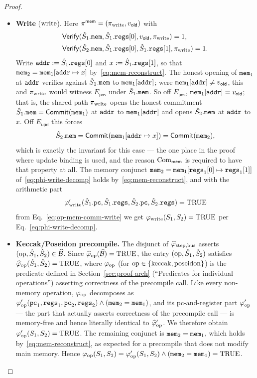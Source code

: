 \begin{proof}
\begin{itemize}
\item \textbf{Write} ($\mathrm{write}$).
  Here $\pi^{\mathsf{mem}}=(\pi_{\mathrm{write}},v_{\mathsf{old}})$ with
  \begin{align*}
    &\mathsf{Verify}(\hat{S}_1.\mathtt{mem},\hat{S}_1.\mathtt{regs}[0],v_{\mathsf{old}},\pi_{\mathrm{write}})=1,\\
    &\mathsf{Verify}(\hat{S}_2.\mathtt{mem},\hat{S}_1.\mathtt{regs}[0],\hat{S}_1.\mathtt{regs}[1],\pi_{\mathrm{write}})=1.
  \end{align*}
  Write $\mathtt{addr}:=\hat{S}_1.\mathtt{regs}[0]$ and $x:=\hat{S}_1.\mathtt{regs}[1]$, so that
  $\mathtt{mem}_2=\mathtt{mem}_1[\mathtt{addr}\mapsto x]$ by~\eqref{eq:mem-reconstruct}. The honest
  opening of $\mathtt{mem}_1$ at $\mathtt{addr}$ verifies against $\hat{S}_1.\mathtt{mem}$ to
  $\mathtt{mem}_1[\mathtt{addr}]$; were $\mathtt{mem}_1[\mathtt{addr}]\neq v_{\mathsf{old}}$, this and
  $\pi_{\mathrm{write}}$ would witness $E_{\mathsf{pos}}$ under $\hat{S}_1.\mathtt{mem}$. So off
  $E_{\mathsf{pos}}$, $\mathtt{mem}_1[\mathtt{addr}]=v_{\mathsf{old}}$; that is, the shared path
  $\pi_{\mathrm{write}}$ opens the honest commitment $\hat{S}_1.\mathtt{mem}=\mathsf{Commit}(\mathtt{mem}_1)$
  at $\mathtt{addr}$ to $\mathtt{mem}_1[\mathtt{addr}]$ and opens $\hat{S}_2.\mathtt{mem}$ at $\mathtt{addr}$ to $x$. Off
  $E_{\mathsf{upd}}$ this forces
  \[
    \hat{S}_2.\mathtt{mem}=\mathsf{Commit}(\mathtt{mem}_1[\mathtt{addr}\mapsto x])=\mathsf{Commit}(\mathtt{mem}_2),
  \]
  which is exactly the invariant for this case --- the one place in the proof
  where update binding is used, and the reason $\mathrm{Com}_{\mathsf{mem}}$ is required
  to have that property at all.  The memory conjunct
  $\mathtt{mem}_2=\mathtt{mem}_1[\mathtt{regs}_1[0]\mapsto\mathtt{regs}_1[1]]$
  of~\eqref{eq:phi-write-decomp} holds by~\eqref{eq:mem-reconstruct}, and with
  the arithmetic part
  \[
    \varphi'_{\mathrm{write}}(\hat{S}_1.\mathtt{pc},\hat{S}_1.\mathtt{regs},\hat{S}_2.\mathtt{pc},\hat{S}_2.\mathtt{regs})=\mathrm{TRUE}
  \]
  from Eq.~\eqref{eq:op-mem-comm-write} we get
  $\varphi_{\mathrm{write}}(S_1,S_2)=\mathrm{TRUE}$ per Eq.~\eqref{eq:phi-write-decomp}.

\item \textbf{Keccak/Poseidon precompile.}
  The disjunct of $\widehat{\varphi}_{\mathrm{step},\mathrm{bus}}$ asserts
  $(\mathrm{op},\hat{S}_1,\hat{S}_2)\in\widehat{\mathcal{B}}$. Since
  $\widehat{\varphi}_{\mathrm{op}}(\widehat{\mathcal{B}})=\mathrm{TRUE}$, the entry
  $(\mathrm{op},\hat{S}_1,\hat{S}_2)$ satisfies
  $\widehat{\varphi}_{\mathrm{op}}(\hat{S}_1,\hat{S}_2)=\mathrm{TRUE}$, where
  $\varphi_{\mathrm{op}}$ (for $\mathrm{op}\in\{\mathrm{keccak},\mathrm{poseidon}\}$) is the predicate defined in
  Section~\ref{sec:proof-arch} (``Predicates for individual operations'')
  asserting correctness of the precompile call.  Like every non-memory
  operation, $\varphi_{\mathrm{op}}$ decomposes as
  $\varphi'_{\mathrm{op}}(\mathtt{pc}_1,\mathtt{regs}_1,\mathtt{pc}_2,\mathtt{regs}_2)\wedge(\mathtt{mem}_2=\mathtt{mem}_1)$, and its
  pc-and-register part $\varphi'_{\mathrm{op}}$ --- the part that actually asserts
  correctness of the precompile call --- is memory-free and hence literally
  identical to $\widehat{\varphi}'_{\mathrm{op}}$.  We therefore obtain
  $\varphi'_{\mathrm{op}}(S_1,S_2)=\mathrm{TRUE}$.  The remaining conjunct is
  $\mathtt{mem}_2=\mathtt{mem}_1$, which holds by~\eqref{eq:mem-reconstruct}, as expected for a
  precompile that does not modify main memory.  Hence
  $\varphi_{\mathrm{op}}(S_1,S_2)=\varphi'_{\mathrm{op}}(S_1,S_2)\wedge(\mathtt{mem}_2=\mathtt{mem}_1)=\mathrm{TRUE}$.
\end{itemize}


\end{proof}
